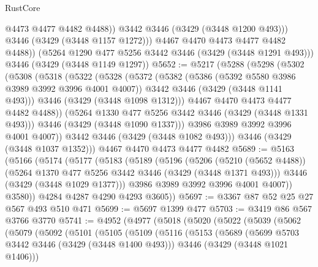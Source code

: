 \begin{lexlean}{RustCore}
\begin{coremodule}
                @4473
                @4477
                @4482
                @4488))
            @3442
            @3446
            (@3429 (@3448 @1200 @493)))
          @3446
          (@3429 (@3448 @1157 @1272)))
        @4467
        @4470
        @4473
        @4477
        @4482
        @4488))
    (@5264 @1290 @477 @5256 @3442 @3446 (@3429 (@3448 @1291 @493)))
    @3446
    (@3429 (@3448 @1149 @1297))
@5652 := @5217
    (@5288
      (@5298
        (@5302
          (@5308
            (@5318
              (@5322
                (@5328
                  (@5372
                    (@5382
                      (@5386 (@5392 @5580 @3986 @3989 @3992 @3996 @4001 @4007))
                      @3442
                      @3446
                      (@3429 (@3448 @1141 @493)))
                    @3446
                    (@3429 (@3448 @1098 @1312)))
                  @4467
                  @4470
                  @4473
                  @4477
                  @4482
                  @4488))
              (@5264 @1330 @477 @5256 @3442 @3446 (@3429 (@3448 @1331 @493)))
              @3446
              (@3429 (@3448 @1090 @1337)))
            @3986
            @3989
            @3992
            @3996
            @4001
            @4007))
        @3442
        @3446
        (@3429 (@3448 @1082 @493)))
      @3446
      (@3429 (@3448 @1037 @1352)))
    @4467
    @4470
    @4473
    @4477
    @4482
@5689 := @5163
    (@5166
      (@5174
        (@5177
          (@5183
            (@5189
              (@5196
                (@5206
                  (@5210 (@5652 @4488))
                  (@5264 @1370 @477 @5256 @3442 @3446 (@3429 (@3448 @1371 @493)))
                  @3446
                  (@3429 (@3448 @1029 @1377)))
                @3986
                @3989
                @3992
                @3996
                @4001
                @4007))
            @3580))
        @4284
        @4287
        @4290
        @4293
        @3605))
@5697 := @3367 @87 @52 @25 @27 @567 @493 @510 @471
@5699 := @5697 @1399 @477
@5703 := @3419 @86 @567 @3766 @3770
@5741 := @4952
    (@4977
      (@5018
        (@5020
          (@5022
            (@5039
              (@5062
                (@5079
                  (@5092
                    (@5101
                      (@5105
                        (@5109
                          (@5116
                            (@5153
                              (@5689
                                (@5699 @5703 @3442 @3446 (@3429 (@3448 @1400 @493)))
                                @3446
                                (@3429 (@3448 @1021 @1406)))

\end{coremodule}
\end{lexlean}
